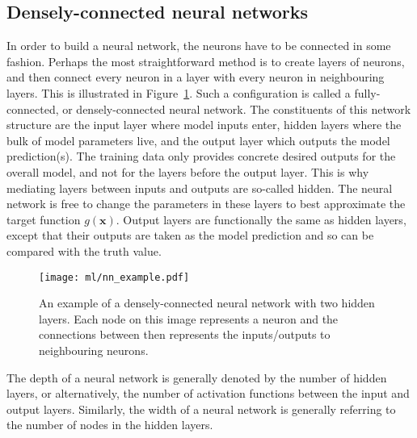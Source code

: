 \documentclass[main.tex]{subfiles}
\begin{document}
\subsection{Densely-connected neural networks}
    In order to build a neural network, the neurons
    have to be connected in some fashion. Perhaps
    the most straightforward method is to create
    layers of neurons, and then connect every neuron
    in a layer with every neuron in neighbouring layers.
    This is illustrated in Figure~\ref{fig:nn_example}.
    Such a configuration is called a fully-connected,
    or densely-connected neural network. The constituents
    of this network structure are the input layer where
    model inputs enter, hidden layers where the bulk of
    model parameters live, and the
    output layer which outputs the model prediction(s).
    The training data only provides concrete desired
    outputs for the overall model, and not for the layers
    before the output layer. This is why mediating layers
    between inputs and outputs are so-called hidden.
    The neural network is free to change the parameters
    in these layers to best approximate the target function
    $g(\mathbf{x})$.
    Output layers are functionally the same as hidden
    layers, except that their outputs are taken as the
    model prediction and so can be compared with the truth
    value.
    
    \begin{figure}
        \texttt{[image: ml/nn\_example.pdf]}
        \caption{An example of a densely-connected
        neural network with two hidden layers.
        Each node on this image represents
        a neuron and the connections between then
        represents the inputs/outputs to neighbouring neurons.}
        \label{fig:nn_example}
    \end{figure}

    The depth of a neural network
    is generally denoted by the number of hidden layers,
    or alternatively, the number of activation functions
    between the input and output layers. Similarly,
    the width of a neural network is generally referring
    to the number of nodes in the hidden layers.
\end{document}
